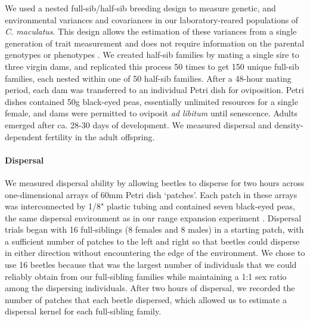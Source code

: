 \documentclass[11pt]{article}
\newcommand{\revise}[1]{{\color{Mahogany}{#1}}}
\begin{document}
We used a nested full-sib/half-sib breeding design to measure genetic, \revise{maternal,} and environmental variances and covariances in our laboratory-reared populations of \textit{C. maculatus}.
This design allows the estimation of these variances from a single generation of trait measurement and does not require information on the parental genotypes or phenotypes \citep{falconer_introduction_1996,conner_primer_2004,wilson_ecologists_2010}.
We created half-sib families by mating a single sire to three virgin dams, and replicated this process 50 times to get 150 unique full-sib families, each nested within one of 50 half-sib families.
After a 48-hour mating period, each dam was transferred to an individual Petri dish for oviposition.
Petri dishes contained 50g black-eyed peas, essentially unlimited resources for a single female, and dams were permitted to oviposit \textit{ad libitum} until senescence.
Adults emerged after ca. 28-30 days of development.
We measured dispersal and density-dependent fertility in the adult offspring.

\paragraph{Dispersal}
We measured dispersal ability by allowing beetles to disperse for two hours across one-dimensional arrays of 60mm Petri dish `patches'.
Each patch in these arrays was interconnected by 1/8" plastic tubing and contained seven black-eyed peas, the same dispersal environment as in our range expansion experiment \citep{ochocki_rapid_2017}.
Dispersal trials began with 16 full-siblings (8 females and 8 males) in a starting patch, with a sufficient number of patches to the left and right so that beetles could disperse in either direction without encountering the edge of the environment.
We chose to use 16 beetles because that was the largest number of individuals that we could reliably obtain from our full-sibling families while maintaining a 1:1 sex ratio among the dispersing individuals.
After two hours of dispersal, we recorded the number of patches that each beetle dispersed, which allowed us to estimate a dispersal kernel for each full-sibling family.
\end{document}
